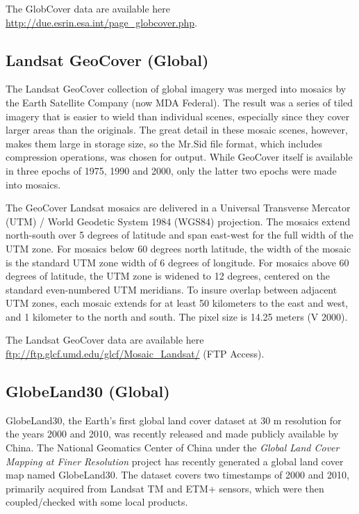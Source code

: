 \documentclass[10pt,b5paper,]{book}
\theoremstyle{definition}
\theoremstyle{definition}
\theoremstyle{definition}
\theoremstyle{remark}
\begin{document}
The GlobCover data are available here
\url{http://due.esrin.esa.int/page_globcover.php}.

\hypertarget{landsat-geocover-global}{%
\subsection{Landsat GeoCover (Global)}\label{landsat-geocover-global}}

The Landsat GeoCover collection of global imagery was merged into
mosaics by the Earth Satellite Company (now MDA Federal). The result was
a series of tiled imagery that is easier to wield than individual
scenes, especially since they cover larger areas than the originals. The
great detail in these mosaic scenes, however, makes them large in
storage size, so the Mr.Sid file format, which includes compression
operations, was chosen for output. While GeoCover itself is available in
three epochs of 1975, 1990 and 2000, only the latter two epochs were
made into mosaics.

The GeoCover Landsat mosaics are delivered in a Universal Transverse
Mercator (UTM) / World Geodetic System 1984 (WGS84) projection. The
mosaics extend north-south over 5 degrees of latitude and span east-west
for the full width of the UTM zone. For mosaics below 60 degrees north
latitude, the width of the mosaic is the standard UTM zone width of 6
degrees of longitude. For mosaics above 60 degrees of latitude, the UTM
zone is widened to 12 degrees, centered on the standard even-numbered
UTM meridians. To insure overlap between adjacent UTM zones, each mosaic
extends for at least 50 kilometers to the east and west, and 1 kilometer
to the north and south. The pixel size is 14.25 meters (V 2000).

The Landsat GeoCover data are available here
\url{ftp://ftp.glcf.umd.edu/glcf/Mosaic_Landsat/} (FTP Access).

\hypertarget{globeland30-global}{%
\subsection{GlobeLand30 (Global)}\label{globeland30-global}}

GlobeLand30, the Earth's first global land cover dataset at 30 m
resolution for the years 2000 and 2010, was recently released and made
publicly available by China. The National Geomatics Center of China
under the \emph{Global Land Cover Mapping at Finer Resolution} project
has recently generated a global land cover map named GlobeLand30. The
dataset covers two timestamps of 2000 and 2010, primarily acquired from
Landsat TM and ETM+ sensors, which were then coupled/checked with some
local products.
\end{document}
